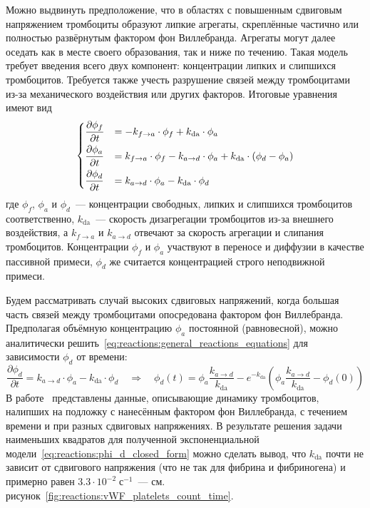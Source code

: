 Можно выдвинуть предположение,
что в областях с повышенным сдвиговым напряжением тромбоциты образуют липкие агрегаты,
скреплённые частично или полностью развёрнутым фактором фон Виллебранда.
Агрегаты могут далее оседать как в месте своего образования, так и ниже по течению.
Такая модель требует введения всего двух компонент:
концентрации липких и слипшихся тромбоцитов.
Требуется также учесть разрушение связей между тромбоцитами из-за механического воздействия
или других факторов.
Итоговые уравнения имеют вид
%
\begin{equation}
    \label{eq:reactions:general_reactions_equations}
    \begin{dcases}
        \frac{\partial \phi_f}{\partial t} &= -k_{f \to a} \cdot \phi_f + k_{\mathrm{da}} \cdot \phi_a \\
        \frac{\partial \phi_a}{\partial t} &=  k_{f \to a} \cdot \phi_f - k_{a \to d} \cdot \phi_a + k_{\mathrm{da}} \cdot (\phi_d - \phi_a) \\
        \frac{\partial \phi_d}{\partial t} &=  k_{a \to d} \cdot \phi_a - k_{\mathrm{da}} \cdot \phi_d \\
    \end{dcases}
\end{equation}
%
где $ \phi_f $, $ \phi_a $ и $ \phi_d $~--- концентрации свободных, липких и слипшихся тромбоцитов соответственно,
$ k_\mathrm{da} $~--- скорость дизагрегации тромбоцитов из-за внешнего воздействия,
а $ k_{f \to a} $ и $ k_{a \to d} $ отвечают за скорость агрегации и слипания тромбоцитов.
Концентрации $ \phi_f $ и $ \phi_a $ участвуют в переносе и диффузии в качестве пассивной примеси,
$ \phi_d $ же считается концентрацией строго неподвижной примеси.

Будем рассматривать случай высоких сдвиговых напряжений,
когда большая часть связей между тромбоцитами опосредована фактором фон Виллебранда.
Предполагая объёмную концентрацию $ \phi_a $ постоянной (равновесной),
можно аналитически решить~\eqref{eq:reactions:general_reactions_equations} для зависимости $ \phi_d $ от времени:
%
\begin{equation}
    \label{eq:reactions:phi_d_closed_form}
    \frac{\partial \phi_d}{\partial t} = k_{a \to d} \cdot \phi_a - k_{\mathrm{da}} \cdot \phi_d
    \quad \Longrightarrow \quad \phi_d(t) = \phi_a \frac{k_{a \to d}}{k_\mathrm{da}} - e^{-k_{\mathrm{da}}} \left( \phi_a \frac{k_{a \to d}}{k_\mathrm{da}} - \phi_d(0) \right)
\end{equation}
%
В работе~\cite{savage1996platelet_adhesion} представлены данные,
описывающие динамику тромбоцитов, налипших на подложку с нанесённым фактором фон Виллебранда,
с течением времени и при разных сдвиговых напряжениях.
В результате решения задачи наименьших квадратов для полученной экспоненциальной модели~\eqref{eq:reactions:phi_d_closed_form}
можно сделать вывод, что $ k_\mathrm{da} $ почти не зависит от сдвигового напряжения
(что не так для фибрина и фибриногена) и примерно равен $ 3.3 \cdot 10^{-2} \; \text{с}^{-1} $~---
см. рисунок~\ref{fig:reactions:vWF_platelets_count_time}.

